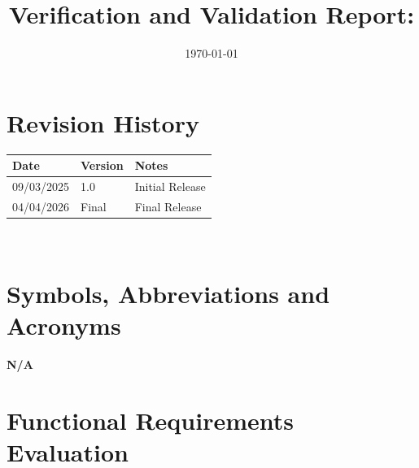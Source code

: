 \documentclass[12pt, titlepage]{article}
\begin{document}
\title{Verification and Validation Report: \progname}
\author{\authname}
\date{\today}

\maketitle


\section{Revision History}

\begin{tabularx}{\textwidth}{p{3cm}p{2cm}X}
\toprule {\bf Date} & {\bf Version} & {\bf Notes}\\
\midrule
09/03/2025 & 1.0 & Initial Release\\
04/04/2026 & Final & Final Release\\
\bottomrule
\end{tabularx}

~\newpage

\section{Symbols, Abbreviations and Acronyms}

\renewcommand{\arraystretch}{1.2}
\textbf{N/A}


\newpage

\tableofcontents

\listoftables %

\listoffigures %

\newpage


\section{Functional Requirements Evaluation}
\setlength{\parindent}{0pt}
\end{document}
